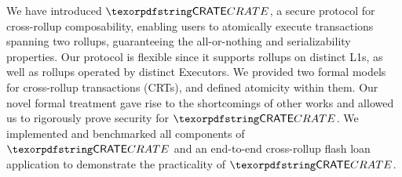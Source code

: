 We have introduced $\pname$, a secure protocol for cross-rollup composability, enabling users to atomically execute transactions spanning two rollups, guaranteeing the all-or-nothing and serializability properties. Our protocol is flexible since it supports rollups on distinct L1s, as well as rollups operated by distinct Executors. We provided two formal models for cross-rollup transactions (CRTs), and defined atomicity within them. Our novel formal treatment gave rise to the shortcomings of other works and allowed us to rigorously prove security for $\pname$. We implemented and benchmarked all components of $\pname$ and an end-to-end cross-rollup flash loan application to demonstrate the practicality of $\pname$.

